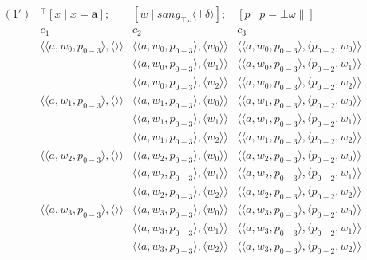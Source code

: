 \documentclass{article}
\newcommand{\tw}{\top\omega}
\newcommand{\bw}{\bot\omega}
\newcommand{\td}{\top\delta}
\begin{document}
\vspace{5mm}
$\begin{array}{llll}
(1') & ^{\top}[x\;|\;x=\mathbf{a}]; & [w\;|\;sang_{\tw}\langle\td\rangle]; & [p\;|\;p=\bw\parallel] \\
& c_1 & c_2 & c_3 \\
& \langle\langle a,w_0,p_{0-3}\rangle,\langle\rangle\rangle & \langle\langle a,w_0,p_{0-3}\rangle,\langle w_0\rangle\rangle & \langle\langle a,w_0,p_{0-3}\rangle,\langle p_{0-2},w_0\rangle\rangle \\
& & \langle\langle a,w_0,p_{0-3}\rangle,\langle w_1\rangle\rangle & \langle\langle a,w_0,p_{0-3}\rangle,\langle p_{0-2},w_1\rangle\rangle \\
& & \langle\langle a,w_0,p_{0-3}\rangle,\langle w_2\rangle\rangle & \langle\langle a,w_0,p_{0-3}\rangle,\langle p_{0-2},w_2\rangle\rangle \\
& \langle\langle a,w_1,p_{0-3}\rangle,\langle\rangle\rangle & \langle\langle a,w_1,p_{0-3}\rangle,\langle w_0\rangle\rangle & \langle\langle a,w_1,p_{0-3}\rangle,\langle p_{0-2},w_0\rangle\rangle  \\
& & \langle\langle a,w_1,p_{0-3}\rangle,\langle w_1\rangle\rangle & \langle\langle a,w_1,p_{0-3}\rangle,\langle p_{0-2},w_1\rangle\rangle \\
& & \langle\langle a,w_1,p_{0-3}\rangle,\langle w_2\rangle\rangle & \langle\langle a,w_1,p_{0-3}\rangle,\langle p_{0-2},w_2\rangle\rangle \\
& \langle\langle a,w_2,p_{0-3}\rangle,\langle\rangle\rangle & \langle\langle a,w_2,p_{0-3}\rangle,\langle w_0\rangle\rangle & \langle\langle a,w_2,p_{0-3}\rangle,\langle p_{0-2},w_0\rangle\rangle \\
& & \langle\langle a,w_2,p_{0-3}\rangle,\langle w_1\rangle\rangle & \langle\langle a,w_2,p_{0-3}\rangle,\langle p_{0-2},w_1\rangle\rangle \\
& & \langle\langle a,w_2,p_{0-3}\rangle,\langle w_2\rangle\rangle & \langle\langle a,w_2,p_{0-3}\rangle,\langle p_{0-2},w_2\rangle\rangle \\
& \langle\langle a,w_3,p_{0-3}\rangle,\langle\rangle\rangle & \langle\langle a,w_3,p_{0-3}\rangle,\langle w_0\rangle\rangle & \langle\langle a,w_3,p_{0-3}\rangle,\langle p_{0-2},w_0\rangle\rangle \\
& & \langle\langle a,w_3,p_{0-3}\rangle,\langle w_1\rangle\rangle & \langle\langle a,w_3,p_{0-3}\rangle,\langle p_{0-2},w_1\rangle\rangle \\
& & \langle\langle a,w_3,p_{0-3}\rangle,\langle w_2\rangle\rangle & \langle\langle a,w_3,p_{0-3}\rangle,\langle p_{0-2},w_2\rangle\rangle \\
\end{array}$
\end{document}
